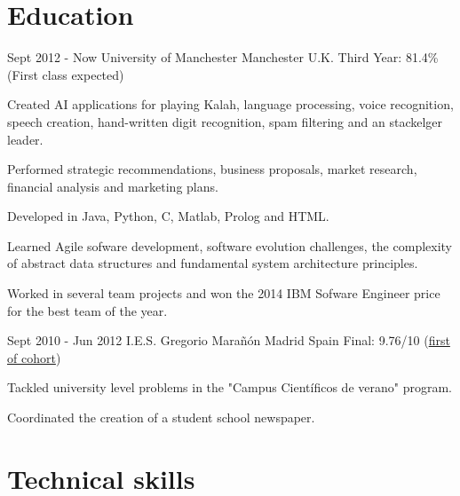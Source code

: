 \documentclass{CurriculumVitae}
\begin{document}
  \section{Education}
   
      {Sept 2012 - Now}
      {University of Manchester}
      {Manchester}
      {U.K.}
      {Third Year: 81.4\% (First class expected)}
      {
         \item Created AI applications for playing Kalah, language processing, voice recognition, speech creation, 
         hand-written digit recognition, spam filtering and an stackelger leader.
         \item Performed strategic recommendations, business proposals, market research, financial analysis and marketing plans.
         \item Developed in Java, Python, C, Matlab, Prolog and HTML.
         \item Learned Agile sofware development, software evolution challenges, the complexity of abstract data structures and
          fundamental system architecture principles. 
         \item Worked in several team projects and won the 2014 IBM Sofware Engineer price for the best team of the year.
      }

      {Sept 2010 - Jun 2012}
      {I.E.S. Gregorio Marañón}
      {Madrid}
      {Spain}
      {Final: 9.76/10 (\underline{first of cohort})}
      {
         \item Tackled university level problems in the "Campus Científicos de verano" program.
         \item Coordinated the creation of a student school newspaper.
      }


  \section{Technical skills}
    
\end{document}
